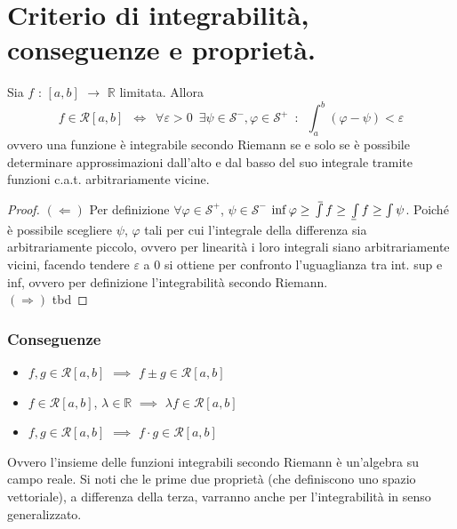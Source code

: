 \documentclass[10pt, oneside]{book}
\theoremstyle{plain}
\def\upint{\mathchoice%
    {\mkern13mu\overline{\vphantom{\intop}\mkern7mu}\mkern-20mu}%
    {\mkern7mu\overline{\vphantom{\intop}\mkern7mu}\mkern-14mu}%
    {\mkern7mu\overline{\vphantom{\intop}\mkern7mu}\mkern-14mu}%
    {\mkern7mu\overline{\vphantom{\intop}\mkern7mu}\mkern-14mu}%
  \int}
\def\lowint{\mkern3mu\underline{\vphantom{\intop}\mkern7mu}\mkern-10mu\int}
\begin{document}
\section{Criterio di integrabilità, conseguenze e proprietà.}
\begin{prop}
    Sia $f$ : $[a,b]$ $\rightarrow$ $\mathbb{R}$  limitata. Allora
    \[f \in \mathcal{R}[a,b] \enspace \Leftrightarrow \enspace \forall \varepsilon > 0 \enspace \exists \psi \in \mathcal{S}^- , \varphi \in \mathcal{S}^+ \enspace : \enspace \int_a^b (\varphi - \psi) < \varepsilon\]
    ovvero una funzione è integrabile secondo Riemann se e solo se è possibile determinare approssimazioni dall'alto e dal basso del suo integrale tramite funzioni c.a.t. arbitrariamente vicine.
\end{prop}
\begin{proof}
    $(\Leftarrow)$ Per definizione $\forall \varphi \in  \mathcal{S}^+$, $\psi \in  \mathcal{S}^-$ $\inf \varphi \geq \upint f \geq \lowint f \geq \int \psi$. Poiché è possibile scegliere $\psi$, $\varphi$ tali per cui l'integrale della differenza sia arbitrariamente piccolo, ovvero per linearità i loro integrali siano arbitrariamente vicini, facendo tendere $\varepsilon$ a 0 si ottiene per confronto l'uguaglianza tra int. sup e inf, ovvero per definizione l'integrabilità secondo Riemann.
    \\$(\Rightarrow)$ tbd
\end{proof}

\subsubsection*{Conseguenze}
\begin{itemize}[label=$\ast$]
    \item $f, g \in \mathcal{R}[a,b] $ $\implies$ $f \pm g \in \mathcal{R}[a,b] $
    \item $f \in \mathcal{R}[a,b] $, $\lambda \in \mathbb{R}$ $\implies$ $\lambda f \in \mathcal{R}[a,b] $
    \item  $f, g \in \mathcal{R}[a,b] $ $\implies$ $f \cdot g \in \mathcal{R}[a,b] $
\end{itemize}

Ovvero l'insieme delle funzioni integrabili secondo Riemann è un'algebra su campo reale. Si noti che le prime due proprietà (che definiscono uno spazio vettoriale), a differenza della terza, varranno anche per l'integrabilità in senso generalizzato.
\end{document}
